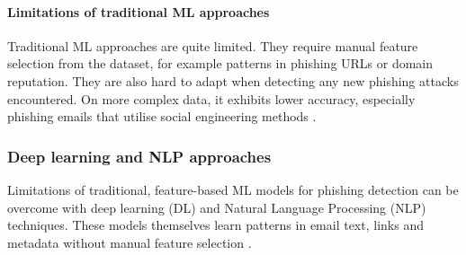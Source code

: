 \paragraph{Limitations of traditional ML approaches}
Traditional ML approaches are quite limited. They require manual feature selection from the dataset, for example patterns in phishing URLs or domain reputation. They are also hard to adapt when detecting any new phishing attacks encountered. On more complex data, it exhibits lower accuracy, especially phishing emails that utilise social engineering methods \citep{almousa2022phishing}.

\subsubsection*{Deep learning and NLP approaches}
Limitations of traditional, feature-based ML models for phishing detection can be overcome with deep learning (DL) and Natural Language Processing (NLP) techniques. These models themselves learn patterns in email text, links and metadata without manual feature selection \citep{bahnsen2017classifying}.


